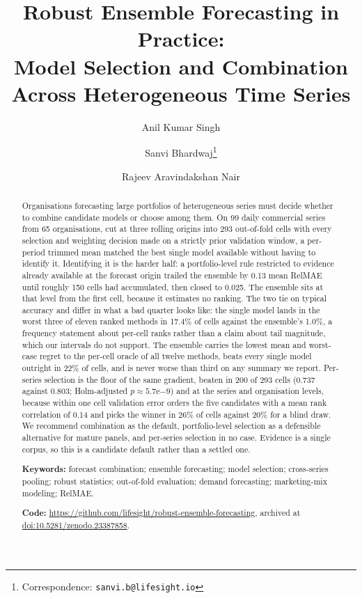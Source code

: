 \documentclass[11pt]{article}
\title{\bfseries Robust Ensemble Forecasting in Practice:\\[2pt]
\large Model Selection and Combination Across Heterogeneous Time Series}
\author[1]{Anil Kumar Singh}
\author[1]{Sanvi Bhardwaj\thanks{Correspondence: \texttt{sanvi.b@lifesight.io}}}
\author[1]{Rajeev Aravindakshan Nair}
\affil[1]{Lifesight}
\date{}
\begin{document}
\maketitle

\begin{abstract}
\noindent Organisations forecasting large portfolios of heterogeneous series must decide whether to combine candidate models or choose among them. On 99 daily commercial series from 65 organisations, cut at three rolling origins into 293 out-of-fold cells with every selection and weighting decision made on a strictly prior validation window, a per-period trimmed mean matched the best single model available without having to identify it. Identifying it is the harder half: a portfolio-level rule restricted to evidence already available at the forecast origin trailed the ensemble by 0.13 mean RelMAE until roughly 150 cells had accumulated, then closed to 0.025. The ensemble sits at that level from the first cell, because it estimates no ranking. The two tie on typical accuracy and differ in what a bad quarter looks like: the single model lands in the worst three of eleven ranked methods in 17.4\% of cells against the ensemble's 1.0\%, a frequency statement about per-cell ranks rather than a claim about tail magnitude, which our intervals do not support. The ensemble carries the lowest mean and worst-case regret to the per-cell oracle of all twelve methods, beats every single model outright in 22\% of cells, and is never worse than third on any summary we report. Per-series selection is the floor of the same gradient, beaten in 200 of 293 cells (0.737 against 0.803; Holm-adjusted $p \approx 5.7\mathrm{e}{-9}$) and at the series and organisation levels, because within one cell validation error orders the five candidates with a mean rank correlation of 0.14 and picks the winner in 26\% of cells against 20\% for a blind draw. We recommend combination as the default, portfolio-level selection as a defensible alternative for mature panels, and per-series selection in no case. Evidence is a single corpus, so this is a candidate default rather than a settled one.

\vspace{6pt}
\noindent\textbf{Keywords:} forecast combination; ensemble forecasting; model selection; cross-series pooling; robust statistics; out-of-fold evaluation; demand forecasting; marketing-mix modeling; RelMAE.

\vspace{3pt}
\noindent\textbf{Code:} \url{https://github.com/lifesight/robust-ensemble-forecasting}, archived at \href{https://doi.org/10.5281/zenodo.23387858}{doi:10.5281/zenodo.23387858}.
\end{abstract}
\end{document}

